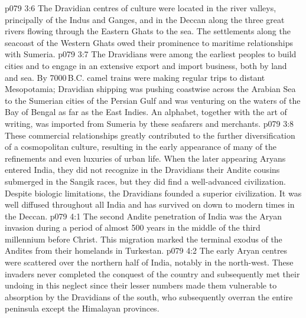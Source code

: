 \vs p079 3:6 \pc The Dravidian centres of culture were located in the river valleys, principally of the Indus and Ganges, and in the Deccan along the three great rivers flowing through the Eastern Ghats to the sea. The settlements along the seacoast of the Western Ghats owed their prominence to maritime relationships with Sumeria.
\vs p079 3:7 The Dravidians were among the earliest peoples to build cities and to engage in an extensive export and import business, both by land and sea. By 7000\,B.C. camel trains were making regular trips to distant Mesopotamia; Dravidian shipping was pushing coastwise across the Arabian Sea to the Sumerian cities of the Persian Gulf and was venturing on the waters of the Bay of Bengal as far as the East Indies. An alphabet, together with the art of writing, was imported from Sumeria by these seafarers and merchants.
\vs p079 3:8 These commercial relationships greatly contributed to the further diversification of a cosmopolitan culture, resulting in the early appearance of many of the refinements and even luxuries of urban life. When the later appearing Aryans entered India, they did not recognize in the Dravidians their Andite cousins submerged in the Sangik races, but they did find a well\hyp{}advanced civilization. Despite biologic limitations, the Dravidians founded a superior civilization. It was well diffused throughout all India and has survived on down to modern times in the Deccan.
\vs p079 4:1 The second Andite penetration of India was the Aryan invasion during a period of almost 500 years in the middle of the third millennium before Christ. This migration marked the terminal exodus of the Andites from their homelands in Turkestan.
\vs p079 4:2 The early Aryan centres were scattered over the northern half of India, notably in the north\hyp{}west. These invaders never completed the conquest of the country and subsequently met their undoing in this neglect since their lesser numbers made them vulnerable to absorption by the Dravidians of the south, who subsequently overran the entire peninsula except the Himalayan provinces.
